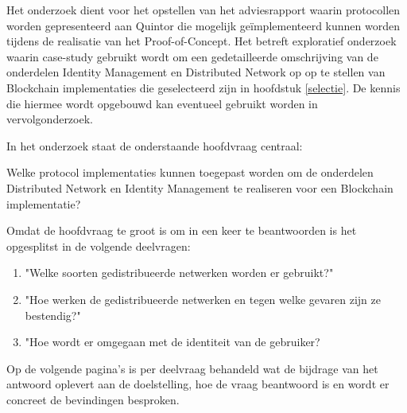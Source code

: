 Het onderzoek dient voor het opstellen van het adviesrapport waarin protocollen worden  gepresenteerd  aan Quintor die mogelijk geïmplementeerd kunnen worden tijdens de realisatie van het Proof-of-Concept. Het betreft exploratief onderzoek waarin case-study gebruikt wordt om een gedetailleerde omschrijving van de onderdelen Identity Management en Distributed Network op op te stellen van Blockchain implementaties die geselecteerd zijn in hoofdstuk \ref{selectie}. De kennis die hiermee wordt opgebouwd kan eventueel gebruikt worden in vervolgonderzoek.

In het onderzoek staat de onderstaande hoofdvraag centraal:
\begin{formal}
  Welke protocol implementaties kunnen toegepast worden om de onderdelen Distributed Network en Identity Management te realiseren voor een Blockchain implementatie?
\end{formal}

Omdat de hoofdvraag te groot is om in een keer te beantwoorden is het opgesplitst in de volgende deelvragen:

\begin{enumerate}[noitemsep]
  \item "Welke soorten gedistribueerde netwerken worden er gebruikt?"
  \item "Hoe werken de gedistribueerde netwerken en tegen welke gevaren zijn ze bestendig?"
  \item "Hoe wordt er omgegaan met de identiteit van de gebruiker?
\end{enumerate}

Op de volgende pagina's is per deelvraag behandeld wat de bijdrage van het antwoord oplevert aan de doelstelling, hoe de vraag beantwoord is en wordt er concreet de bevindingen besproken.